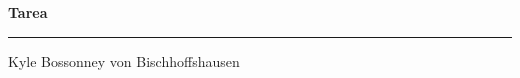 \documentclass{article}
\begin{document}
\begin{center}
    \Huge
    \textbf{Tarea} 
    \vspace{10pt}
    \hrule
    \vspace{10pt}
    \huge 
    Kyle Bossonney von Bischhoffshausen
    \normalsize
\end{center}
\end{document}

